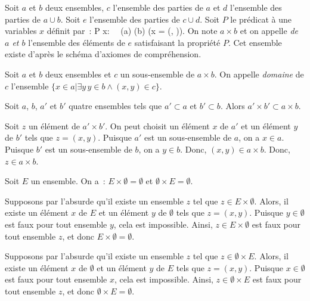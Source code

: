 Soit $a$ et $b$ deux ensembles, $c$ l'ensemble des parties de $a$ et $d$ l'ensemble des parties de $a \cup b$. 
Soit $e$ l'ensemble des parties de $c \cup d$. 
Soit $P$ le prédicat à une variables $x$ définit par : 
\startformula
    P x: \exists \alpha \, \exists \beta \, (\alpha \in a) \wedge (\beta \in b) \wedge (x = (\alpha, \beta)).
\stopformula
On note $a \times b$ et on appelle \emph{ de $a$ et $b$} l'ensemble des éléments de $e$ satisfaisant la propriété $P$.
Cet ensemble existe d'après le schéma d'axiomes de compréhension. 

Soit $a$ et $b$ deux ensembles et $c$ un sous-ensemble de $a \times b$. 
On appelle \emph{domaine} de $c$ l'ensemble $\lbrace x \in a \vert \exists y \, y \in b \wedge (x,y) \in c \rbrace$. 

\blank[medium]

\noindent{} Soit $a$, $b$, $a'$ et $b'$ quatre ensembles tels que $a' \subset a$ et $b' \subset b$. 
    Alors $a' \times b' \subset a \times b$.

\blank[medium]

\noindent{}
    Soit $z$ un élément de $a' \times b'$. 
    On peut choisit un élément $x$ de $a'$ et un élément $y$ de $b'$ tels que $z = (x,y)$.
    Puisque $a'$ est un sous-ensemble de $a$, on a $x \in a$.
    Puisque $b'$ est un sous-ensemble de $b$, on a $y \in b$. 
    Donc, $(x,y) \in a \times b$.
    Donc, $z \in a \times b$.

   \done 

\blank[medium]

\noindent{} Soit $E$ un ensemble. 
    On a : $E \times \emptyset = \emptyset$ et $\emptyset \times E = \emptyset$.

\blank[medium]

\noindent{} 
\startitemize[nowhite]
    \item Supposons par l'absurde qu'il existe un ensemble $z$ tel que $z \in E \times \emptyset$.
        Alors, il existe un élément $x$ de $E$ et un élément $y$ de $\emptyset$ tels que $z = (x,y)$. 
        Puisque $y \in \emptyset$ est faux pour tout ensemble $y$, cela est impossible.
        Ainsi, $z \in E \times \emptyset$ est faux pour tout ensemble $z$, et donc $E \times \emptyset = \emptyset$.
    \item Supposons par l'absurde qu'il existe un ensemble $z$ tel que $z \in \emptyset \times E$.
        Alors, il existe un élément $x$ de $\emptyset$ et un élément $y$ de $E$ tels que $z = (x,y)$. 
        Puisque $x \in \emptyset$ est faux pour tout ensemble $x$, cela est impossible.
        Ainsi, $z \in \emptyset \times E$ est faux pour tout ensemble $z$, et donc $\emptyset \times E = \emptyset$.
\stopitemize

